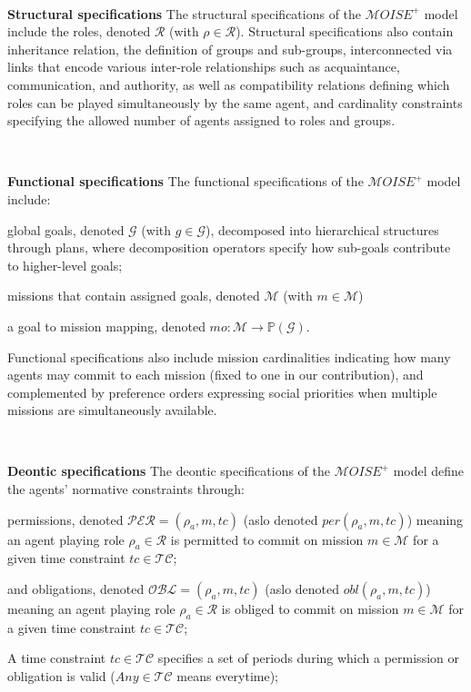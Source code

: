 \documentclass[pdflatex,sn-mathphys-num]{sn-jnl}%
\theoremstyle{thmstyleone}%
\theoremstyle{thmstyletwo}%
\theoremstyle{thmstylethree}%
\begin{document}
\

\noindent \textbf{Structural specifications} \quad
%
The structural specifications of the $\mathcal{M}OISE^+$ model include the roles, denoted $\mathcal{R}$ (with $\rho \in \mathcal{R}$).
%
Structural specifications also contain inheritance relation, the definition of groups and sub-groups, interconnected via links that encode various inter-role relationships such as acquaintance, communication, and authority, as well as compatibility relations defining which roles can be played simultaneously by the same agent, and cardinality constraints specifying the allowed number of agents assigned to roles and groups.

\

\noindent \textbf{Functional specifications} \quad
%
The functional specifications of the $\mathcal{M}OISE^+$ model include:
%
\begin{enumerate*}[label={\roman*)}, itemjoin={; \quad}]
    \item global goals, denoted $\mathcal{G}$ (with $g \in \mathcal{G}$), decomposed into hierarchical structures through plans, where decomposition operators specify how sub-goals contribute to higher-level goals;
    \item missions that contain assigned goals, denoted $\mathcal{M}$ (with $m \in \mathcal{M}$)
    \item a goal to mission mapping, denoted $mo: \mathcal{M} \rightarrow \mathbb{P}(\mathcal{G})$.
\end{enumerate*}
%
Functional specifications also include mission cardinalities indicating how many agents may commit to each mission (fixed to one in our contribution), and complemented by preference orders expressing social priorities when multiple missions are simultaneously available.

\

\noindent \textbf{Deontic specifications} \quad
%
The deontic specifications of the $\mathcal{M}OISE^+$ model define the agents' normative constraints through:
%
\begin{enumerate*}[label={\roman*)}, itemjoin={; \quad}]
    \item permissions, denoted $\mathcal{PER} = (\rho_a,m,tc)$ (aslo denoted $per(\rho_a,m,tc)$) meaning an agent playing role $\rho_a \in \mathcal{R}$ is permitted to commit on mission $m \in \mathcal{M}$ for a given time constraint $tc \in \mathcal{TC}$;
    \item and obligations, denoted $\mathcal{OBL} = (\rho_a,m,tc)$ (aslo denoted $obl(\rho_a,m,tc)$) meaning an agent playing role $\rho_a \in \mathcal{R}$ is obliged to commit on mission $m \in \mathcal{M}$ for a given time constraint $tc \in \mathcal{TC}$;
\end{enumerate*}
%
A time constraint $tc \in \mathcal{TC}$ specifies a set of periods during which a permission or obligation is valid ($Any \in \mathcal{TC}$ means everytime);
\end{document}
